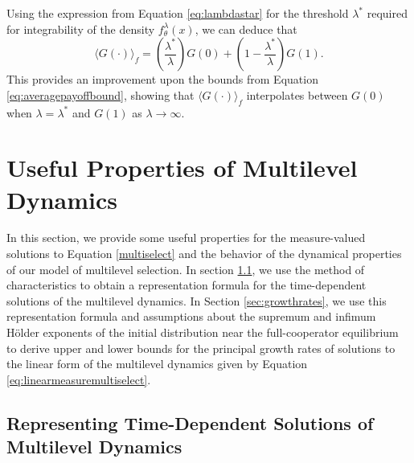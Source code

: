 \documentclass[11pt]{article}
\numberwithin{equation}{section}
\begin{document}
{\begin{equation}
\end{equation}
%
 Using the expression from Equation \eqref{eq:lambdastar} for the threshold $\lambda^*$ required for integrability of the density $f^{\lambda}_{\theta}(x)$, we can deduce that
\begin{equation} \label{eq:averageofthetawithlambdastaragain}
    \langle G(\cdot) \rangle_f = \left(\frac{\lambda^*}{\lambda}\right) G(0) + \left( 1 - \frac{\lambda^*}{\lambda} \right) G(1).
\end{equation}
This provides an improvement upon the bounds from Equation \eqref{eq:averagepayoffbound}, showing that $ \langle G(\cdot) \rangle_f$ interpolates between $G(0)$ when $\lambda = \lambda^*$ and $G(1)$ as $\lambda \to \infty$. 


\section{Useful Properties of Multilevel Dynamics}
\label{sec:dynamicalproperties}

In this section, we provide some useful properties for the measure-valued solutions to Equation \ref{multiselect} and the behavior of the dynamical properties of our model of multilevel selection. In section \ref{sec:methodofcharacteristics}, we use the method of characteristics to obtain a representation formula for the time-dependent solutions of the multilevel dynamics. In Section \ref{sec:growthrates}, we use this representation formula and assumptions about the supremum and infimum H{\"o}lder exponents of the initial distribution near the full-cooperator equilibrium to derive upper and lower bounds for the principal growth rates of solutions to the linear form of the multilevel dynamics given by Equation \eqref{eq:linearmeasuremultiselect}.

\subsection{Representing Time-Dependent Solutions of Multilevel Dynamics}
\label{sec:methodofcharacteristics}


}
\end{document}

